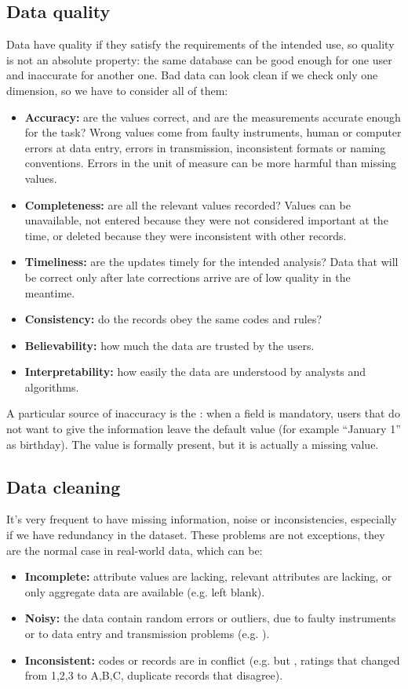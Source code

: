 \subsection{Data quality}
Data have quality if they satisfy the requirements of the intended use, so quality is not an absolute property: the same database can be good enough for one user and inaccurate for another one. Bad data can look clean if we check only one dimension, so we have to consider all of them:
\begin{itemize}
    \item \textbf{Accuracy:} are the values correct, and are the measurements accurate enough for the task? Wrong values come from faulty instruments, human or computer errors at data entry, errors in transmission, inconsistent formats or naming conventions. Errors in the unit of measure can be more harmful than missing values.
    \item \textbf{Completeness:} are all the relevant values recorded? Values can be unavailable, not entered because they were not considered important at the time, or deleted because they were inconsistent with other records.
    \item \textbf{Timeliness:} are the updates timely for the intended analysis? Data that will be correct only after late corrections arrive are of low quality in the meantime.
    \item \textbf{Consistency:} do the records obey the same codes and rules?
    \item \textbf{Believability:} how much the data are trusted by the users.
    \item \textbf{Interpretability:} how easily the data are understood by analysts and algorithms.
\end{itemize}
\begin{remark}
    A particular source of inaccuracy is the : when a field is mandatory, users that do not want to give the information leave the default value (for example ``January 1'' as birthday). The value is formally present, but it is actually a missing value.
\end{remark}


\subsection{Data cleaning}
It's very frequent to have missing information, noise or inconsistencies, especially if we have redundancy in the dataset.
These problems are not exceptions, they are the normal case in real-world data, which can be:
\begin{itemize}
    \item \textbf{Incomplete:} attribute values are lacking, relevant attributes are lacking, or only aggregate data are available (e.g.  left blank).
    \item \textbf{Noisy:} the data contain random errors or outliers, due to faulty instruments or to data entry and transmission problems (e.g. ).
    \item \textbf{Inconsistent:} codes or records are in conflict (e.g.  but , ratings that changed from 1,2,3 to A,B,C, duplicate records that disagree).
\end{itemize}
